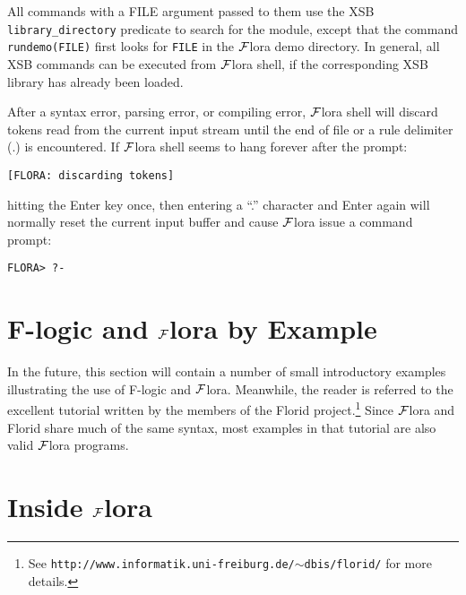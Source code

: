 \documentclass[11pt]{article}
\newcommand{\FLORA}{{\mbox{${\cal F}${\sc lora}}}\xspace}
\newcommand{\FLORID}{{\mbox{\sc Florid}}\xspace}
\newcommand{\fl}{{F-logic}\xspace}
\begin{document}
All commands with a FILE argument passed to them use the XSB {\tt
  library\_directory} predicate to search for the module, except that the
command {\tt rundemo(FILE)} first looks for {\tt FILE} in the \FLORA demo
directory. In general, all XSB commands can be executed from \FLORA shell,
if the corresponding XSB library has already been loaded.

After a syntax error, parsing error, or compiling error, \FLORA shell will
discard tokens read from the current input stream until the end of file or a
rule delimiter (.) is encountered. If \FLORA shell seems to hang forever
after the prompt:
\begin{verbatim}
[FLORA: discarding tokens]
\end{verbatim}
hitting the Enter key once, then entering a ``.'' character and Enter again
will normally reset the current input buffer and cause \FLORA issue a
command prompt:
\begin{verbatim}
FLORA> ?-
\end{verbatim}

 
\section{\fl and \FLORA by Example}

In the future, this section will contain a number of small
introductory examples illustrating the use of F-logic and \FLORA. Meanwhile, the
reader is referred to the excellent tutorial written by the members of the
\FLORID project.\footnote{
  See {\tt http://www.informatik.uni-freiburg.de/$\sim$dbis/florid/} for more
  details.
  }
Since \FLORA and \FLORID share much of the same syntax, most examples in that
tutorial are also valid \FLORA programs.



\section{Inside \FLORA}
\end{document}
